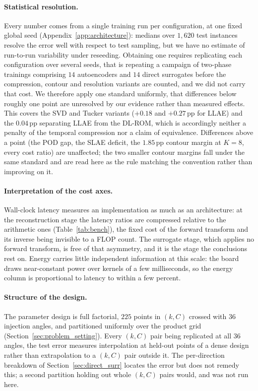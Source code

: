 ﻿\documentclass[a4paper,12pt]{article}
\theoremstyle{definition}
\theoremstyle{remark}
\begin{document}
\paragraph{Statistical resolution.}
Every number comes from a single training run per configuration, at one fixed global seed (Appendix~\ref{app:architecture}): medians over $1{,}620$ test instances resolve the error well with respect to test sampling, but we have no estimate of run-to-run variability under reseeding. Obtaining one requires replicating each configuration over several seeds, that is repeating a campaign of two-phase trainings comprising $14$ autoencoders and $14$ direct surrogates before the compression, contour and resolution variants are counted, and we did not carry that cost. We therefore apply one standard uniformly, that differences below roughly one point are unresolved by our evidence rather than measured effects. This covers the SVD and Tucker variants ($+0.18$ and $+0.27$\,pp for LLAE) and the $0.04$\,pp separating LLAE from the DL-ROM, which is accordingly neither a penalty of the temporal compression nor a claim of equivalence. Differences above a point (the POD gap, the SLAE deficit, the $1.85$\,pp contour margin at $K=8$, every cost ratio) are unaffected; the two smaller contour margins fall under the same standard and are read here as the rule matching the convention rather than improving on it.

\paragraph{Interpretation of the cost axes.}
Wall-clock latency measures an implementation as much as an architecture: at the reconstruction stage the latency ratios are compressed relative to the arithmetic ones (Table~\ref{tab:bench}), the fixed cost of the forward transform and its inverse being invisible to a FLOP count. The surrogate stage, which applies no forward transform, is free of that asymmetry, and it is the stage the conclusions rest on. Energy carries little independent information at this scale: the board draws near-constant power over kernels of a few milliseconds, so the energy column is proportional to latency to within a few percent.

\paragraph{Structure of the design.}
The parameter design is full factorial, $225$ points in $(k,C)$ crossed with $36$ injection angles, and partitioned uniformly over the product grid (Section~\ref{sec:problem_setting}). Every $(k,C)$ pair being replicated at all $36$ angles, the test error measures interpolation at held-out points of a dense design rather than extrapolation to a $(k,C)$ pair outside it. The per-direction breakdown of Section~\ref{sec:direct_surr} locates the error but does not remedy this; a second partition holding out whole $(k,C)$ pairs would, and was not run here.
\end{document}
